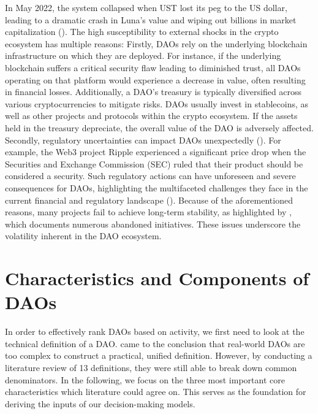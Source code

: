 In May 2022, the system collapsed when UST lost its peg to the US dollar, leading to a dramatic crash in Luna's value and wiping out billions in market capitalization (\cite{briola2023anatomy}).
The high susceptibility to external shocks in the crypto ecosystem has multiple reasons: Firstly, DAOs rely on the underlying blockchain infrastructure on which they are deployed.
For instance, if the underlying blockchain suffers a critical security flaw leading to diminished trust, all DAOs operating on that platform would experience a decrease in value, often resulting in financial losses.
Additionally, a DAO’s treasury is typically diversified across various cryptocurrencies to mitigate risks. DAOs usually invest in stablecoins, as well as other projects and protocols within the crypto ecosystem.
If the assets held in the treasury depreciate, the overall value of the DAO is adversely affected.
Secondly, regulatory uncertainties can impact DAOs unexpectedly (\cite{gudkov2017legal}).
For example, the Web3 project Ripple experienced a significant price drop when the Securities and Exchange Commission (SEC) ruled that their product should be considered a security.
Such regulatory actions can have unforeseen and severe consequences for DAOs, highlighting the multifaceted challenges they face in the current financial and regulatory landscape (\cite{hennelly2022cryptic}).
%
Because of the aforementioned reasons, many projects fail to achieve long-term stability, as highlighted by \textcite{alphaquest2024dead}, which documents numerous abandoned initiatives. These issues underscore the volatility inherent in the DAO ecosystem.

\section{Characteristics and Components of DAOs}

In order to effectively rank DAOs based on activity, we first need to look at the technical definition of a DAO. 
\textcite{rikken2023ins} came to the conclusion that real-world DAOs are too complex to construct a practical, unified definition. However, by conducting a literature review of 13 definitions, they were still able to break down common denominators. In the following, we focus on the three most important core characteristics which literature could agree on. This serves as the foundation for deriving the inputs of our decision-making models.


